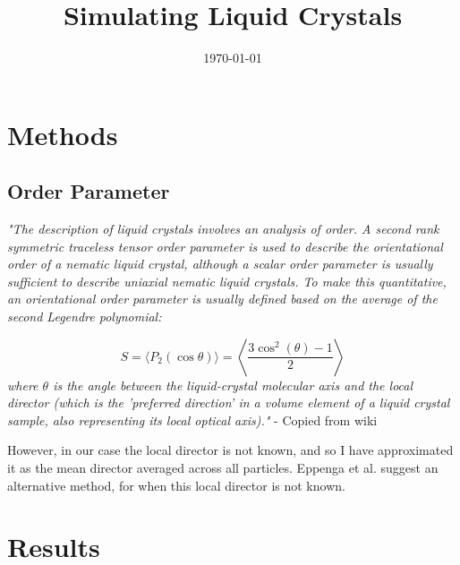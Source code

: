 \documentclass[11pt, a4paper]{article} %
\title{Simulating Liquid Crystals}
\author{\authorstyle{Kit Gallagher} 
	\institution{Supervisors: Prof Erika Eiser, Mr Jiaming Yu}}
\date{\today} %
\begin{document}
\maketitle %

\thispagestyle{firstpage} %






\section{Methods}
\subsection{Order Parameter} \label{Order_param_theory}
\textit{"The description of liquid crystals involves an analysis of order. A second rank symmetric traceless tensor order parameter is used to describe the orientational order of a nematic liquid crystal, although a scalar order parameter is usually sufficient to describe uniaxial nematic liquid crystals. To make this quantitative, an orientational order parameter is usually defined based on the average of the second Legendre polynomial:}

\begin{equation}
 S=\langle P_{2}(\cos \theta )\rangle =\left\langle {\frac {3\cos ^{2}(\theta )-1}{2}}\right\rangle
\end{equation}
\textit{where $\theta$ is the angle between the liquid-crystal molecular axis and the local director (which is the 'preferred direction' in a volume element of a liquid crystal sample, also representing its local optical axis)."} - Copied from wiki

However, in our case the local director is not known, and so I have approximated it as the mean director averaged across all particles. Eppenga et al. \cite{Eppenga1984} suggest an alternative method, for when this local director is not known.

\section{Results}
\end{document}
